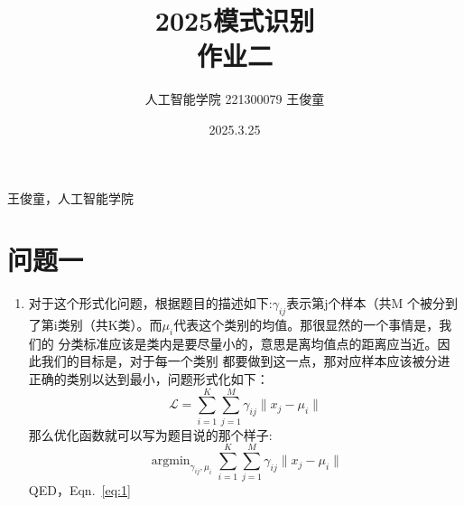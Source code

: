 \documentclass[answers]{exam}  %
\title{2025模式识别 \\ 作业二}
\date{2025.3.25}
\author{人工智能学院 221300079 王俊童}
\begin{document}
{} 王俊童，人工智能学院
\section{问题一}
\begin{enumerate}[label=\alph*.] 
    \item 对于这个形式化问题，根据题目的描述如下:$\gamma_{ij}$表示第j个样本（共M
    个被分到了第i类别（共K类）。而$\mu_i$代表这个类别的均值。那很显然的一个事情是，我们的
    分类标准应该是类内是要尽量小的，意思是离均值点的距离应当近。因此我们的目标是，对于每一个类别
    都要做到这一点，那对应样本应该被分进正确的类别以达到最小，问题形式化如下：
    \begin{equation*}
        \mathcal{L} =\sum_{i=1}^{K}\sum_{j=1}^{M}\gamma_{ij}\|x_j-\mu_i\|
    \end{equation*}
    那么优化函数就可以写为题目说的那个样子:
    \begin{equation}
        \label{eq:1}
        \mathop{\arg\min}_{\gamma_{ij},\mu_i} \sum_{i=1}^{K}\sum_{j=1}^{M}\gamma_{ij}\|x_j-\mu_i\|
    \end{equation}
    QED，Eqn.~\ref{eq:1}


\end{enumerate}
\end{document}
